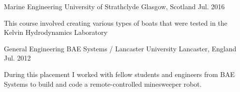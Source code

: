 \begin{cventries}
  \cventry
    {Marine Engineering} %
    {University of Strathclyde} %
    {Glasgow, Scotland} %
    {Jul. 2016} %
    {
      \begin{cvitems} %
        \item {This course involved creating various types of boats that were tested in the Kelvin Hydrodynamics Laboratory}
      \end{cvitems}
    }
  \newline

  \cventry
    {General Engineering} %
    {BAE Systems / Lancaster University} %
    {Lancaster, England} %
    {Jul. 2012} %
    {
      \begin{cvitems} %
        \item {During this placement I worked with fellow students and engineers from BAE Systems to build and code a remote-controlled minesweeper robot.}
      \end{cvitems}
    }
    \newline
\end{cventries}
